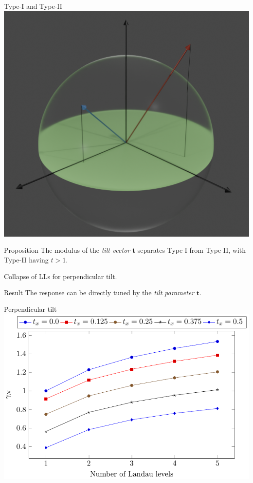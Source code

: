 \documentclass{beamer}
\renewcommand\vec\bm
\begin{document}
\begin{frame}{Type-I and Type-II}
  \centering
  \includegraphics[width=.5\textwidth]{tiltSpherewBackground}
  \begin{block}{Proposition}
    The modulus of the \emph{tilt vector} \( \vec{t} \) separates Type-I from Type-II, with Type-II having \( t > 1 \).

    Collapse of LLs for perpendicular tilt.
  \end{block}
\end{frame}
\begin{frame}[standout]
  \begin{block}{Result}
    The response can be directly tuned by the \emph{tilt parameter} \( \vec{t} \).
  \end{block}
\end{frame}
\begin{frame}{Perpendicular tilt}
  \centering
  \includegraphics[width=.7\textwidth]{contribtx}
\end{frame}
\end{document}
